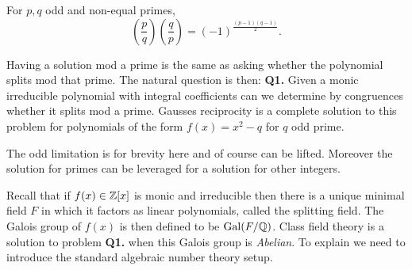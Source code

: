 \begin{Theorem}
	For \(p, q\) odd and non-equal primes,
	\[\left(\frac{p}{q}\right)\left(\frac{q}{p}\right) = (-1)^{\frac{(p-1)(q-1)}{2}}.\]
\end{Theorem}

Having a solution mod a prime is the same as asking whether the polynomial splits mod that prime. The natural question is then: \textbf{Q1.} Given a monic irreducible polynomial with integral coefficients can we determine by congruences whether it splits mod a prime. Gausses reciprocity is a complete solution to this problem for polynomials of the form \(f(x) = x^2 - q\) for \(q\) odd prime. 
\begin{remark}
	The odd limitation is for brevity here and of course can be lifted. Moreover the solution for primes can be leveraged for a solution for other integers. 
\end{remark}
Recall that if \(f(x)\in \Z[x]\) is monic and irreducible then there is a unique minimal field \(F\) in which it factors as linear polynomials, called the splitting field. The Galois group of \(f(x)\) is then defined to be \(\mathrm{Gal}(F/\Q)\). Class field theory is a solution to problem \textbf{Q1.} when this Galois group is \textit{Abelian}. To explain we need to introduce the standard algebraic number theory setup.

